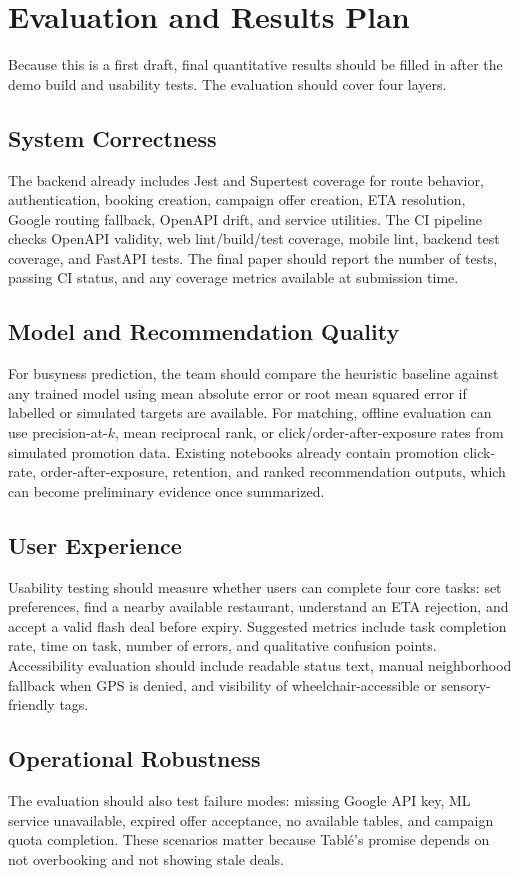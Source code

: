 \documentclass[conference]{IEEEtran}
\begin{document}
\section{Evaluation and Results Plan}
Because this is a first draft, final quantitative results should be filled in after the demo build and usability tests. The evaluation should cover four layers.

\subsection{System Correctness}
The backend already includes Jest and Supertest coverage for route behavior, authentication, booking creation, campaign offer creation, ETA resolution, Google routing fallback, OpenAPI drift, and service utilities. The CI pipeline checks OpenAPI validity, web lint/build/test coverage, mobile lint, backend test coverage, and FastAPI tests. The final paper should report the number of tests, passing CI status, and any coverage metrics available at submission time.

\subsection{Model and Recommendation Quality}
For busyness prediction, the team should compare the heuristic baseline against any trained model using mean absolute error or root mean squared error if labelled or simulated targets are available. For matching, offline evaluation can use precision-at-$k$, mean reciprocal rank, or click/order-after-exposure rates from simulated promotion data. Existing notebooks already contain promotion click-rate, order-after-exposure, retention, and ranked recommendation outputs, which can become preliminary evidence once summarized.

\subsection{User Experience}
Usability testing should measure whether users can complete four core tasks: set preferences, find a nearby available restaurant, understand an ETA rejection, and accept a valid flash deal before expiry. Suggested metrics include task completion rate, time on task, number of errors, and qualitative confusion points. Accessibility evaluation should include readable status text, manual neighborhood fallback when GPS is denied, and visibility of wheelchair-accessible or sensory-friendly tags.

\subsection{Operational Robustness}
The evaluation should also test failure modes: missing Google API key, ML service unavailable, expired offer acceptance, no available tables, and campaign quota completion. These scenarios matter because Tabl\'e's promise depends on not overbooking and not showing stale deals.
\end{document}

